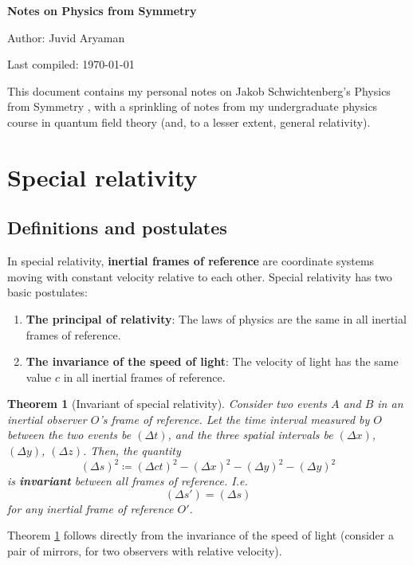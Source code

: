 \documentclass[11pt]{article}
\numberwithin{equation}{section}
\newcommand{\defeq}{\coloneqq}
\newtheorem{thm}{Theorem}[section]
\begin{document}
\begin{flushleft}
\textbf{\Large Notes on Physics from Symmetry}
\end{flushleft}

\begin{flushleft}
Author: Juvid Aryaman

Last compiled: \today
\end{flushleft}

\noindent This document contains my personal notes on Jakob Schwichtenberg's Physics from Symmetry \citep{Schwichtenberg15}, with a sprinkling of notes from my undergraduate physics course in quantum field theory (and, to a lesser extent, general relativity).


\section{Special relativity}

\subsection{Definitions and postulates} \label{sec:postualtes-sr}

In special relativity, \textbf{inertial frames of reference} are coordinate systems moving with constant velocity relative to each other. Special relativity has two basic postulates:
\begin{enumerate}
\item \textbf{The principal of relativity}: The laws of physics are the same in all inertial frames of reference.
\item \textbf{The invariance of the speed of light}: The velocity of light has the same value $c$ in all inertial frames of reference.
\end{enumerate}

\begin{thm}[Invariant of special relativity]\label{thm:invariant-sr}
Consider two events $A$ and $B$ in an inertial observer $O$'s frame of reference. Let the time interval measured by $O$ between the two events be $(\Delta t)$, and the three spatial intervals be $(\Delta x)$, $(\Delta y)$, $(\Delta z)$. Then, the quantity
\begin{equation}
(\Delta s)^2 \defeq (\Delta c t)^2 - (\Delta x)^2 - (\Delta y)^2 - (\Delta y)^2
\end{equation}
is \textbf{invariant} between all frames of reference. I.e.
\begin{equation}
(\Delta s') = (\Delta s)
\end{equation}
for any inertial frame of reference $O'$.
\end{thm}
\noindent Theorem \ref{thm:invariant-sr} follows directly from the invariance of the speed of light (consider a pair of mirrors, for two observers with relative velocity).
\end{document}
